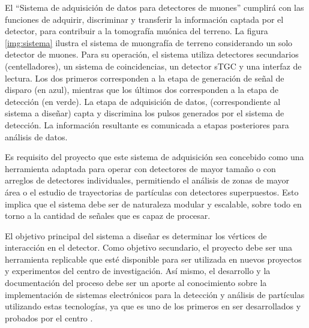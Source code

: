 	El ``Sistema de adquisición de datos para detectores de muones'' cumplirá con las funciones de adquirir, discriminar y transferir la información captada por el detector, para contribuir a la tomografía muónica del terreno. La figura \ref{img:sistema} ilustra el sistema de muongrafía de terreno considerando un solo detector de muones. Para su operación, el sistema utiliza detectores secundarios (centelladores), un sistema de coincidencias, un detector sTGC y una interfaz de lectura. Los dos primeros corresponden a la etapa de generación de señal de disparo (en azul), mientras que los últimos dos corresponden a la etapa de detección (en verde). La etapa de adquisición de datos, (correspondiente al sistema  a diseñar) capta y discrimina los pulsos generados por el sistema de detección. La información resultante es comunicada a etapas posteriores para análisis de datos. 
	
	Es requisito del proyecto que este sistema de adquisición sea concebido como una herramienta adaptada para operar con detectores de mayor tamaño o con arreglos de detectores individuales, permitiendo el análisis de zonas de mayor área o el estudio de trayectorias de partículas con detectores superpuestos. Esto implica que el sistema debe ser de naturaleza modular y escalable, sobre todo en torno a la cantidad de señales que es capaz de procesar.  %
	
	El objetivo principal del sistema a diseñar es determinar los vértices de interacción en el detector. Como objetivo secundario, el proyecto debe ser una herramienta replicable que esté disponible para ser utilizada en nuevos proyectos y experimentos del centro de investigación. Así mismo, el desarrollo y la documentación del proceso debe ser un aporte al conocimiento sobre la implementación de sistemas electrónicos para la detección y análisis de partículas utilizando estas tecnologías, ya que es uno de los primeros en ser desarrollados y probados por el centro . %
	
